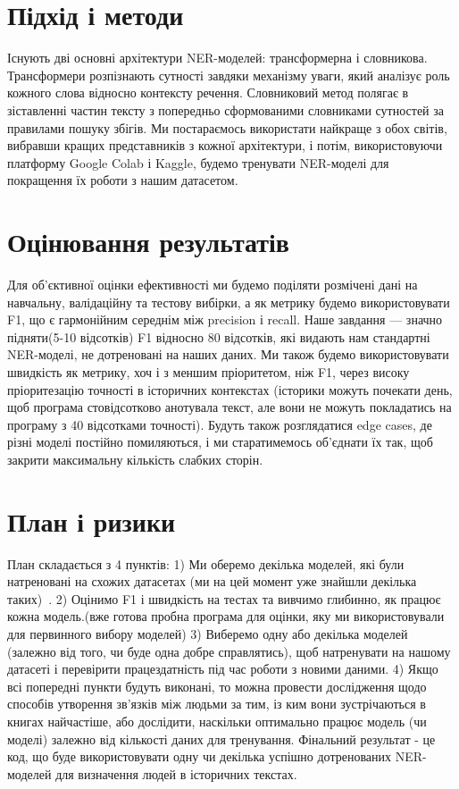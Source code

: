 \documentclass[ukrainian]{ucuproposal}
\begin{document}
\section{Підхід і методи}
Існують дві основні архітектури NER-моделей: трансформерна і словникова. Трансформери розпізнають сутності завдяки механізму уваги, який аналізує роль кожного слова відносно контексту речення. Словниковий метод полягає в зіставленні частин тексту з попередньо сформованими словниками сутностей за правилами пошуку збігів. Ми постараємось використати найкраще з обох світів, вибравши кращих представників з кожної архітектури, і потім, використовуючи платформу Google Colab і Kaggle, будемо тренувати NER-моделі для покращення їх роботи з нашим датасетом.

\section{Оцінювання результатів}
Для об'єктивної оцінки ефективності ми будемо поділяти розмічені дані на навчальну, валідаційну та тестову вибірки, а як метрику будемо використовувати F1, що є гармонійним середнім між precision і recall. Наше завдання — значно підняти(5-10 відсотків) F1 відносно 80 відсотків, які видають нам стандартні NER-моделі, не дотреновані на наших даних. Ми також будемо використовувати швидкість як метрику, хоч і з меншим пріоритетом, ніж F1, через високу пріоритезацію точності в історичних контекстах (історики можуть почекати день, щоб програма стовідсотково анотувала текст, але вони не можуть покладатись на програму з 40 відсотками точності). Будуть також розглядатися edge cases, де різні моделі постійно помиляються, і ми старатимемось об'єднати їх так, щоб закрити максимальну кількість слабких сторін.

\section{План і ризики}
План складається з 4 пунктів: 1) Ми оберемо декілька моделей, які були натреновані на схожих датасетах (ми на цей момент уже знайшли декілька таких)~\cite{efontes_ner,magistermilitum_roberta_medieval}. 2) Оцінимо F1 і швидкість на тестах та вивчимо глибинно, як працює кожна модель.(вже готова пробна програма для оцінки, яку ми використовували для первинного вибору моделей) 3) Виберемо одну або декілька моделей (залежно від того, чи буде одна добре справлятись), щоб натренувати на нашому датасеті і перевірити працездатність під час роботи з новими даними. 4) Якщо всі попередні пункти будуть виконані, то можна провести дослідження щодо способів утворення зв'язків між людьми за тим, із ким вони зустрічаються в книгах найчастіше, або дослідити, наскільки оптимально працює модель (чи моделі) залежно від кількості даних для тренування. Фінальний результат - це код, що буде використовувати одну чи декілька успішно дотренованих NER-моделей для визначення людей в історичних текстах.
\end{document}
